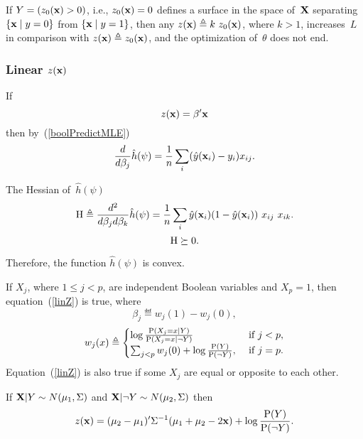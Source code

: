 \documentclass[10pt,a4paper]{article}
\theoremstyle{plain} \newtheorem{Lem}{Lemma}
\begin{document}
If $Y = (z_0(\mathbf x) > 0)$, i.e., $z_0(\mathbf x) = 0$ defines a surface in the space of~$\mathbf X$ separating $\{\mathbf x \mid y = 0\}$ from $\{\mathbf x \mid y = 1\}$,
then any $z(\mathbf x) \triangleq k \ z_0(\mathbf x)$, where $k > 1$, increases~$L$ in comparison with $z(\mathbf x) \triangleq z_0(\mathbf x)$,
and the optimization of~$\theta$ does not end.



\subsubsection{Linear $z(\mathbf x)$}

If
\begin{equation}\label{linZ}
z(\mathbf x) = \mathbf \beta' \mathbf x
\end{equation}
then by~(\ref{boolPredictMLE})
$$ \frac d {d \beta_j} \hat h (\psi) = \frac 1 n \sum_i (\hat y(\mathbf x_i) - y_i) x_{ij}. $$

The Hessian of~$\hat h (\psi)$
$$ \mathrm H \triangleq \frac {d^2} {d \beta_j d \beta_k} \hat h (\psi) = \frac 1 n \sum_i \hat y (\mathbf x_i) (1 - \hat y (\mathbf x_i)) \ x_{ij} \ x_{ik}. $$
$$ \mathrm H \succeq 0. $$

Therefore, the function $\hat h (\psi)$ is convex.

If $X_j$, where $1 \le j < p$, are independent Boolean variables and $X_p = 1$,
then equation~(\ref{linZ}) is true, where
$$ \beta_j \eqdef w_j(1) - w_j(0), $$
\begin{equation}
w_j(x) \triangleq
\begin{cases}
\log \frac {\mathrm P(X_j = x|Y)} {\mathrm P(X_j = x|\neg Y)} &\text{ if } j < p, \\
\sum_{j < p} w_j(0) + \log \frac {\mathrm P(Y)} {\mathrm P(\neg Y)}, &\text{ if } j = p.
\end{cases}
\end{equation}
Equation~(\ref{linZ}) is also true if some $X_j$ are equal or opposite to each other.


If
$\mathbf X|Y      \sim N(\mathbf \mu_1, \mathrm \Sigma)$ and
$\mathbf X|\neg Y \sim N(\mathbf \mu_2, \mathrm \Sigma)$
then
$$ z(\mathbf x) = (\mathbf \mu_2 - \mathbf \mu_1)' \mathrm \Sigma^{-1} (\mathbf \mu_1 + \mathbf \mu_2 - 2 \mathbf x) + \log \frac {\mathrm P(Y)} {\mathrm P(\neg Y)}. $$
\end{document}

